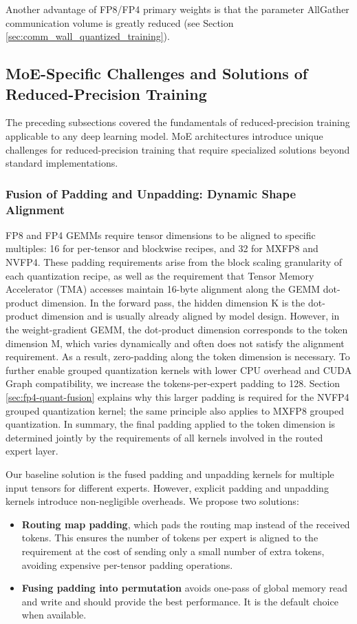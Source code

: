 \documentclass[10pt,logo,copyright]{nvidiatechreport}
\begin{document}
Another advantage of FP8/FP4 primary weights is that the parameter AllGather communication volume is greatly reduced (see Section \ref{sec:comm_wall_quantized_training}).


\subsection{MoE-Specific Challenges and Solutions of Reduced-Precision Training}

The preceding subsections covered the fundamentals of reduced-precision training applicable to any deep learning model. MoE architectures introduce unique challenges for reduced-precision training that require specialized solutions beyond standard implementations.

\subsubsection{Fusion of Padding and Unpadding: Dynamic Shape Alignment}
FP8 and FP4 GEMMs require tensor dimensions to be aligned to specific multiples: 16 for per-tensor and blockwise recipes, and 32 for MXFP8 and NVFP4. These padding requirements arise from the block scaling granularity of each quantization recipe, as well as the requirement that Tensor Memory Accelerator (TMA) accesses maintain 16-byte alignment along the GEMM dot-product dimension. In the forward pass, the hidden dimension K is the dot-product dimension and is usually already aligned by model design. However, in the weight-gradient GEMM, the dot-product dimension corresponds to the token dimension M, which varies dynamically and often does not satisfy the alignment requirement. As a result, zero-padding along the token dimension is necessary. To further enable grouped quantization kernels with lower CPU overhead and CUDA Graph compatibility, we increase the tokens-per-expert padding to 128. Section \ref{sec:fp4-quant-fusion} explains why this larger padding is required for the NVFP4 grouped quantization kernel; the same principle also applies to MXFP8 grouped quantization. In summary, the final padding applied to the token dimension is determined jointly by the requirements of all kernels involved in the routed expert layer.

Our baseline solution is the fused padding and unpadding kernels for multiple input tensors for different experts. However, explicit padding and unpadding kernels introduce non-negligible overheads. We propose two solutions:
\begin{itemize}
    \item \textbf{Routing map padding}, which pads the routing map instead of the received tokens. This ensures the number of tokens per expert is aligned to the requirement at the cost of sending only a small number of extra tokens, avoiding expensive per-tensor padding operations.
    \item \textbf{Fusing padding into permutation} avoids one-pass of global memory read and write and should provide the best performance. It is the default choice when available.
\end{itemize}
\end{document}

